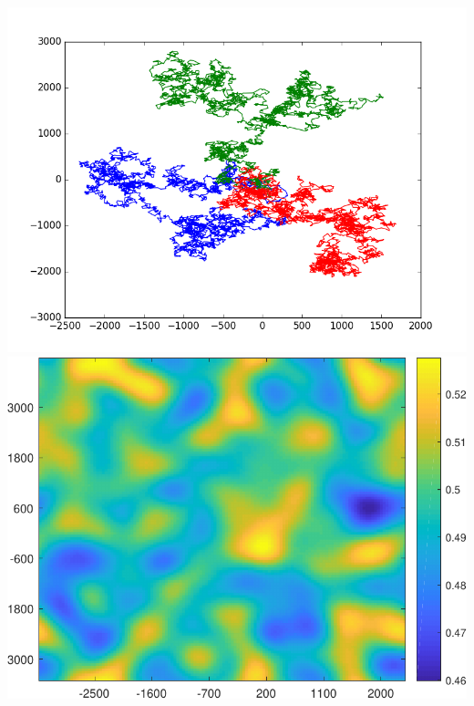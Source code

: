 \begin{memo}[Memorandum]
\begin{center}
\includegraphics[width=.4\textwidth,height=.25\textwidth]{figures/interact/way.png}
\includegraphics[width=.4\textwidth,height=.25\textwidth]{figures/interact/env.pdf}
\end{center}

\end{memo}
